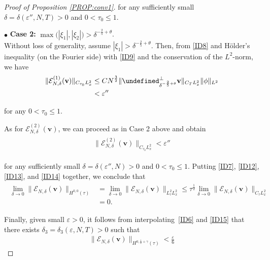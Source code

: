 \documentclass[letterpaper, 11pt,  reqno]{amsart}
\newcommand{\1}{\hspace{0.5mm}\textup{I}\hspace{0.5mm}}
\newcommand{\noi}{\noindent}
\let\P= \undefined
\newcommand{\P}{\mathbf{P}}
\newcommand{\EE}{\mathcal{E}}
\newcommand{\dl}{\delta}
\newcommand{\eps}{\varepsilon}
\newcommand{\g}{\gamma}
\newcommand{\ta}{\theta}
\newcommand{\vv}{\mathbf{v}}
\numberwithin{equation}{section}
\numberwithin{theorem}{section}
\begin{document}
\begin{proof}[Proof of Proposition \ref{PROP:conv1}]
\noi
for any sufficiently small
$\dl = \dl(\eps'',   N, T)>0$
and $0 < \tau_0 \le1 $.





\smallskip

\noi
$\bullet$ {\bf Case 2:}
 $\max\big(|\xi_1|, |\xi_2|\big) > \dl^{-\frac 25 +\ta}$.
\\
\indent
Without loss of generality, assume 
$|\xi_1| >  \dl^{-\frac 25 +\ta}$.
Then, 
from \eqref{ID8} and  H\"older's inequality (on the Fourier side)
with \eqref{ID9} and the conservation of the $L^2$-norm, 
we have
\begin{align}
\begin{split}
\|\EE_{N, \dl}^{(1)}(\vv)\|_{C_{\tau_0} L^2_x}
& \le C    N^\frac 32 \| \P^\perp_{\dl^{-\frac 25 + \ta}} \vv\|_{C_{T}L^2_x}
 \|\phi\|_{L^2}\\
& < \eps''
\end{split}
\label{ID13}
\end{align}


\noi
for any $0 < \tau_0 \le1 $.


\medskip

As for $\EE_{N, \dl}^{(2)}(\vv)$, 
we can proceed as in Case 2 above and obtain
\begin{align}
\begin{split}
\|\EE_{N, \dl}^{(2)}(\vv)\|_{C_{\tau_0} L^2_x}
 <  \eps''
\end{split}
\label{ID14}
\end{align}

\noi
for any 
sufficiently small
$\dl = \dl(\eps'',   N)>0$
and 
$0 < \tau_0  \le1 $.
Putting \eqref{ID7}, \eqref{ID12}, \eqref{ID13}, and \eqref{ID14}
together, we conclude that 
\begin{align}
\begin{split}
\lim_{\dl \to 0 } \|\EE_{N, \dl}(\vv)\|_{H^{0, 0}(\tau)} 
& = \lim_{\dl \to 0 } \|\EE_{N, \dl}(\vv)\|_{L^2_\tau L^2_x} 
\le \tau^\frac 12 \lim_{\dl \to 0 } \|\EE_{N, \dl}(\vv)\|_{C_\tau L^2_x} \\
& = 0. 
\end{split}
\label{ID15}
\end{align}

\noi
Finally, 
given small $\eps > 0$, 
it follows from 
interpolating~\eqref{ID6} and \eqref{ID15}
that there exists $\dl_3 = \dl_3(\eps, N, T) > 0$
such that 
\begin{align}
\|\EE_{N, \dl}(\vv)\|_{H^{0, \frac 12 + \g}(\tau)}
< \frac \eps 6
\label{ID16}
\end{align}



\end{proof}
\end{document}
